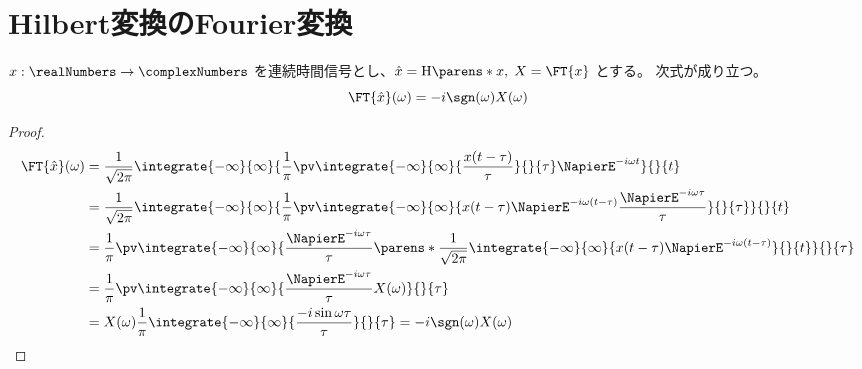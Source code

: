     \chapter{Hilbert変換のFourier変換}
        \begin{shadebox}
            $x:\realNumbers\to\complexNumbers$ を連続時間信号とし、$\hat{x} = \HilbertTransform{x},\;X = \FT{x}$ とする。
            次式が成り立つ。
            \[ \FT{\hat{x}}(\omega) = -i\sgn(\omega)X(\omega) \]
        \end{shadebox}
        \begin{proof}
            \begin{align*}
                \FT{\hat{x}}(\omega) &= \frac{1}{\sqrt{2\pi}}\integrate{-\infty}{\infty}{\frac{1}{\pi}\pv\integrate{-\infty}{\infty}{\frac{x(t-\tau)}{\tau}}{}{\tau}\NapierE^{-i\omega t}}{}{t} \\
                &= \frac{1}{\sqrt{2\pi}}\integrate{-\infty}{\infty}{\frac{1}{\pi}\pv\integrate{-\infty}{\infty}{x(t-\tau)\NapierE^{-i\omega(t-\tau)}\frac{\NapierE^{-i\omega \tau}}{\tau}}{}{\tau}}{}{t} \\
                &= \frac{1}{\pi}\pv\integrate{-\infty}{\infty}{\frac{\NapierE^{-i\omega \tau}}{\tau}\parens*{\frac{1}{\sqrt{2\pi}}\integrate{-\infty}{\infty}{x(t-\tau)\NapierE^{-i\omega(t-\tau)}}{}{t}}}{}{\tau} \\
                &= \frac{1}{\pi}\pv\integrate{-\infty}{\infty}{\frac{\NapierE^{-i\omega \tau}}{\tau}X(\omega)}{}{\tau} \\
                &= X(\omega)\frac{1}{\pi}\integrate{-\infty}{\infty}{\frac{-i\sin\omega\tau}{\tau}}{}{\tau} = -i\sgn(\omega)X(\omega)
            \end{align*}
        \end{proof}